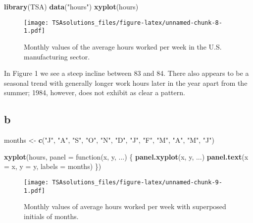 \documentclass[]{book}
\newenvironment{Shaded}{\begin{snugshade}}{\end{snugshade}}
\newcommand{\KeywordTok}[1]{\textcolor[rgb]{0.13,0.29,0.53}{\textbf{{#1}}}}
\newcommand{\DataTypeTok}[1]{\textcolor[rgb]{0.13,0.29,0.53}{{#1}}}
\newcommand{\StringTok}[1]{\textcolor[rgb]{0.31,0.60,0.02}{{#1}}}
\newcommand{\NormalTok}[1]{{#1}}
\begin{document}
\begin{Shaded}
\begin{Highlighting}[]
\KeywordTok{library}\NormalTok{(TSA)}
\KeywordTok{data}\NormalTok{(}\StringTok{"hours"}\NormalTok{)}
\KeywordTok{xyplot}\NormalTok{(hours)}
\end{Highlighting}
\end{Shaded}

\begin{figure}[htbp]
\centering
\texttt{[image: TSAsolutions\_files/figure-latex/unnamed-chunk-8-1.pdf]}
\caption{\label{fig:unnamed-chunk-8}Monthly values of the average hours
worked per week in the U.S. manufacturing sector.}
\end{figure}

In Figure 1 we see a steep incline between 83 and 84. There also appears
to be a seasonal trend with generally longer work hours later in the
year apart from the summer; 1984, however, does not exhibit as clear a
pattern.

\subsection*{b}\label{b-21}

\begin{Shaded}
\begin{Highlighting}[]
\NormalTok{months <-}\StringTok{ }\KeywordTok{c}\NormalTok{(}\StringTok{"J"}\NormalTok{, }\StringTok{"A"}\NormalTok{, }\StringTok{"S"}\NormalTok{, }\StringTok{"O"}\NormalTok{, }\StringTok{"N"}\NormalTok{, }\StringTok{"D"}\NormalTok{, }\StringTok{"J"}\NormalTok{, }\StringTok{"F"}\NormalTok{, }\StringTok{"M"}\NormalTok{, }\StringTok{"A"}\NormalTok{, }\StringTok{"M"}\NormalTok{, }\StringTok{"J"}\NormalTok{)}

\KeywordTok{xyplot}\NormalTok{(hours, }\DataTypeTok{panel =} \NormalTok{function(x, y, ...) \{}
  \KeywordTok{panel.xyplot}\NormalTok{(x, y, ...)}
  \KeywordTok{panel.text}\NormalTok{(}\DataTypeTok{x =} \NormalTok{x, }\DataTypeTok{y =} \NormalTok{y, }\DataTypeTok{labels =} \NormalTok{months)}
\NormalTok{\})}
\end{Highlighting}
\end{Shaded}

\begin{figure}[htbp]
\centering
\texttt{[image: TSAsolutions\_files/figure-latex/unnamed-chunk-9-1.pdf]}
\caption{\label{fig:unnamed-chunk-9}Monthly values of average hours worked
per week with superposed initials of months.}
\end{figure}
\end{document}
